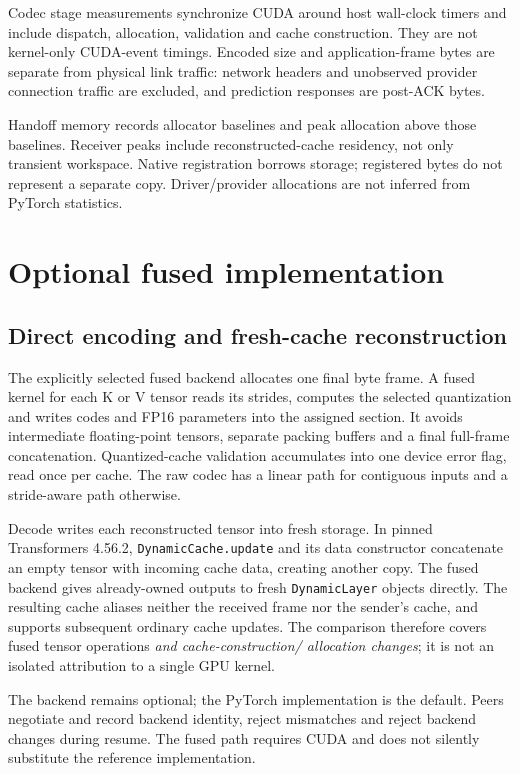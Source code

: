 \documentclass[10pt,twocolumn,letterpaper]{article}
\begin{document}
Codec stage measurements synchronize CUDA around host wall-clock timers and
include dispatch, allocation, validation and cache construction. They are not
kernel-only CUDA-event timings. Encoded size and application-frame bytes are
separate from physical link traffic: network headers and unobserved provider
connection traffic are excluded, and prediction responses are post-ACK bytes.

Handoff memory records allocator baselines and peak allocation above those
baselines. Receiver peaks include reconstructed-cache residency, not only
transient workspace. Native registration borrows storage; registered bytes do
not represent a separate copy. Driver/provider allocations are not inferred
from PyTorch statistics.

\section{Optional fused implementation}
\subsection{Direct encoding and fresh-cache reconstruction}
The explicitly selected fused backend allocates one final byte frame. A fused
kernel for each K or V tensor reads its strides, computes the selected
quantization and writes codes and FP16 parameters into the assigned section.
It avoids intermediate floating-point tensors, separate packing buffers and a
final full-frame concatenation. Quantized-cache validation accumulates into
one device error flag, read once per cache. The raw codec has a linear path
for contiguous inputs and a stride-aware path otherwise.

Decode writes each reconstructed tensor into fresh storage. In pinned
Transformers 4.56.2, \texttt{DynamicCache.update} and its data constructor
concatenate an empty tensor with incoming cache data, creating another copy.
The fused backend gives already-owned outputs to fresh \texttt{DynamicLayer}
objects directly. The resulting cache aliases neither the received frame nor
the sender's cache, and supports subsequent ordinary cache updates. The
comparison therefore covers fused tensor operations \emph{and cache-construction/
allocation changes}; it is not an isolated attribution to a single GPU kernel.

The backend remains optional; the PyTorch implementation is the default.
Peers negotiate and record backend identity, reject mismatches and reject
backend changes during resume. The fused path requires CUDA and does not
silently substitute the reference implementation.
\end{document}
